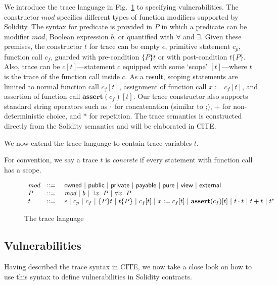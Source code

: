 We introduce the trace language in Fig.~\ref{fig:assert} to specifying vulnerabilities. The constructor $\textit{mod}$ specifies different types of function modifiers supported by Solidity. The syntax for predicate is provided in $P$ in which a predicate can be modifier $\textit{mod}$, Boolean expression $b$, or quantified with $\forall$ and $\exists$. Given these premises, the constructor $t$ for trace can be empty $\epsilon$, primitive statement $c_p$, function call $c_f$, guarded with pre-condition $\{P\}t$ or with post-condition $t\{P\}$. Also, trace can be $c[t]$---statement $c$ equipped with some `scope' $[t]$---where $t$ is the trace of the function call inside $c$. As a result, scoping statements are limited to normal function call $c_f[t]$, assignment of function call $x := c_f[t]$, and assertion of function call $\textbf{assert}(c_f)[t]$. Our trace constructor also supports standard string operators such as $\cdot$ for concatenation (similar to ;), $+$ for non-deterministic choice, and $*$ for repetition. The trace semantics is constructed directly from the Solidity semantics and will be elaborated in CITE.

We now extend the trace language to contain trace variables $\bar{t}$.

For convention, we say a trace $t$ is \emph{concrete} if every statement with function call has a scope. 


\begin{figure}[t]
$
\begin{array}{lcl}
\textit{mod}&::=~&\textsf{owned}~|~ \textsf{public}~|~\textsf{private}~|~\textsf{payable}~|~\textsf{pure}~|~\textsf{view}~|~\textsf{external}\\
P&::=~&\textit{mod}~|~ b ~|~ \exists x.~P~|~ \forall x.~P\\
t&::=~&\epsilon~|~c_{p}~|~c_f~|~\{P\}t~|~t\{P\}~|~c_f[t]~|~x:=c_f[t]~|~\textbf{assert}(c_f)[t]~|~t \cdot t~|~t+t~|~t^*
\end{array}
$
\caption{The trace language}\label{fig:assert}
\end{figure}

\subsection{Vulnerabilities}

Having described the trace syntax in CITE, we now take a close look on how to use this syntax to define vulnerabilities in Solidity contracts.



